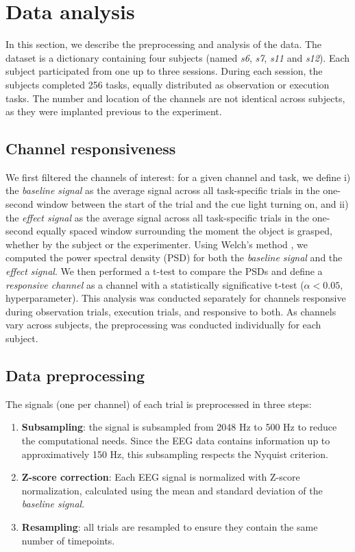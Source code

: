\documentclass[10pt,conference,compsocconf]{IEEEtran}
\begin{document}
\section{Data analysis}
\label{sec:analysis}
In this section, we describe the preprocessing and analysis of the data. The dataset is a dictionary containing four subjects (named \textit{s6}, \textit{s7}, \textit{s11} and \textit{s12}). Each subject participated from one up to three sessions. During each session, the subjects completed 256 tasks, equally distributed as observation or execution tasks. The number and location of the channels are not identical across subjects, as they were implanted previous to the experiment.

\subsection{Channel responsiveness}
\label{sec:channelresponsiveness}
We first filtered the channels of interest: for a given channel and task, we define i) the \textit{baseline signal} as the average signal across all task-specific trials in the one-second window between the start of the trial and the cue light turning on, and ii) the \textit{effect signal} as the average signal across all task-specific trials in the one-second equally spaced window surrounding the moment the object is grasped, whether by the subject or the experimenter. Using Welch's method \cite{welch}, we computed the power spectral density (PSD) for both the \textit{baseline signal} and the \textit{effect signal}. We then performed a t-test to compare the PSDs and define a \textit{responsive channel} as a channel with a statistically significative t-test (\(\alpha<0.05\), hyperparameter). This analysis was conducted separately for channels responsive during observation trials, execution trials, and responsive to both. As channels vary across subjects, the preprocessing was conducted individually for each subject.

\subsection{Data preprocessing}
\label{subsec:preproc}
The signals (one per channel) of each trial is preprocessed in three steps:
\begin{enumerate}
  \item \textbf{Subsampling}: the signal is subsampled from 2048 Hz to 500 Hz to reduce the computational needs. Since the EEG data contains information up to approximatively 150 Hz, this subsampling respects the Nyquist criterion.
  \item \textbf{Z-score correction}: Each EEG signal is normalized with Z-score normalization, calculated using the mean and standard deviation of the \textit{baseline signal}.
  \item \textbf{Resampling}: all trials are resampled to ensure they contain the same number of timepoints.
\end{enumerate}
\end{document}
